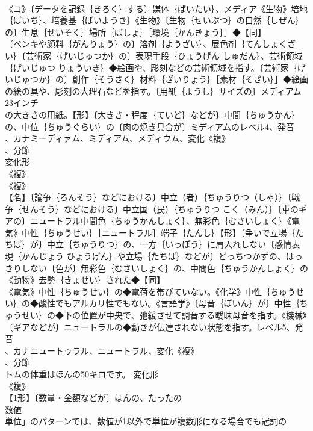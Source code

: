 \documentclass[8pt]{extreport}
\begin{document}
\begin{CJK}{UTF8}{min}
\\	《コ》〔データを記録｛きろく｝する〕媒体｛ばいたい｝、メディア《生物》培地｛ばいち｝、培養基｛ばいようき｝《生物》〔生物｛せいぶつ｝の自然｛しぜん｝の〕生息｛せいそく｝場所｛ばしょ｝［環境｛かんきょう｝］◆【同】
\\	〔ペンキや顔料｛がんりょう｝の〕溶剤｛ようざい｝、展色剤｛てんしょくざい｝〔芸術家｛げいじゅつか｝の〕表現手段｛ひょうげん しゅだん｝、芸術領域｛げいじゅつ りょういき｝◆絵画や、彫刻などの芸術領域を指す。〔芸術家｛げいじゅつか｝の〕創作｛そうさく｝材料｛ざいりょう｝［素材｛そざい｝］◆絵画の絵の具や、彫刻の大理石などを指す。〔用紙｛ようし｝サイズの〕メディアム
\\	23インチ
\\	の大きさの用紙。【形】〔大きさ・程度｛ていど｝などが〕中間｛ちゅうかん｝の、中位｛ちゅうぐらい｝の〔肉の焼き具合が〕ミディアムのレベル4、発音
\\	、カナミーディァム、ミディアム、メディウム、変化《複》
\\	、分節
\\	変化形 
\\	《複》
\\	《複》
\\	【名】〔論争｛ろんそう｝などにおける〕中立（者）｛ちゅうりつ（しゃ）｝〔戦争｛せんそう｝などにおける〕中立国（民）｛ちゅうりつ こく（みん）｝〔車のギアの〕ニュートラル中間色｛ちゅうかんしょく｝、無彩色｛むさいしょく｝《電気》中性｛ちゅうせい｝［ニュートラル］端子｛たんし｝【形】〔争いで立場｛たちば｝が〕中立｛ちゅうりつ｝の、一方｛いっぽう｝に肩入れしない〔感情表現｛かんじょう ひょうげん｝や立場｛たちば｝などが〕どっちつかずの、はっきりしない〔色が〕無彩色｛むさいしょく｝の、中間色｛ちゅうかんしょく｝の《動物》去勢｛きょせい｝された◆【同】
\\	《電気》中性｛ちゅうせい｝の◆電荷を帯びていない。《化学》中性｛ちゅうせい｝の◆酸性でもアルカリ性でもない。《言語学》〔母音｛ぼいん｝が〕中性｛ちゅうせい｝の◆下の位置が中央で、弛緩させて調音する曖昧母音を指す。《機械》〔ギアなどが〕ニュートラルの◆動きが伝達されない状態を指す。レベル5、発音
\\	、カナニュートゥラル、ニュートラル、変化《複》
\\	、分節
\\	トムの体重はほんの50キロです。	変化形 
\\	《複》
\\	【1形】〔数量・金額などが〕ほんの、たったの
\\	数値 
\\	単位」のパターンでは、数値が1以外で単位が複数形になる場合でも冠詞の

\end{CJK}
\end{document}
